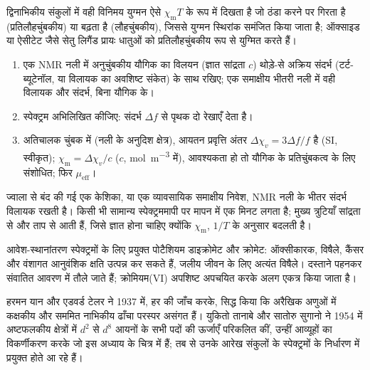 द्विनाभिकीय संकुलों में वही विनिमय युग्मन ऐसे $\chi_{\mathrm m}T$ के रूप में दिखता है जो ठंडा करने पर
गिरता है (प्रतिलौहचुंबकीय) या बढ़ता है (लौहचुंबकीय), जिससे युग्मन
स्थिरांक समंजित किया जाता है; ऑक्साइड या ऐसीटेट जैसे सेतु लिगैंड प्रायः
धातुओं को प्रतिलौहचुंबकीय रूप से युग्मित करते हैं।

\begin{method}[इवान्स विधि द्वारा चुंबकीय आघूर्ण]\label{met:b3:complex-spectra-magnetism:evans}
\begin{enumerate}
  \item एक NMR नली में अनुचुंबकीय यौगिक का विलयन (ज्ञात
        सांद्रता $c$) थोड़े-से अक्रिय संदर्भ (टर्ट-ब्यूटेनॉल, या
        विलायक का अवशिष्ट संकेत) के साथ रखिए; एक समाक्षीय भीतरी नली में वही विलायक और
        संदर्भ, बिना यौगिक के।
  \item {} स्पेक्ट्रम अभिलिखित कीजिए: संदर्भ $\Delta f$ से पृथक दो रेखाएँ देता है।
  \item अतिचालक चुंबक में (नली के अनुदिश क्षेत्र), आयतन
        प्रवृत्ति अंतर $\Delta\chi_v = 3\Delta f/f$ है (SI, स्वीकृत); $\chi_{\mathrm m} = \Delta\chi_v/c$ ($c$,
        \unit{mol.m^{-3}} में), आवश्यकता हो तो यौगिक के प्रतिचुंबकत्व के लिए संशोधित;
        फिर $\mu_{\mathrm{eff}}$।
\end{enumerate}
\end{method}

\begin{inthelab}[एक इवान्स मापन]
ज्वाला से बंद की गई एक केशिका, या एक व्यावसायिक समाक्षीय निवेश, NMR नली के भीतर संदर्भ
विलायक रखती है। किसी भी सामान्य स्पेक्ट्रममापी पर मापन में एक मिनट लगता है;
मुख्य त्रुटियाँ सांद्रता से और ताप से आती हैं,
जिसे ज्ञात होना चाहिए क्योंकि $\chi_{\mathrm m}$, $1/T$ के अनुसार बदलती है।
\end{inthelab}

\begin{safety}{}
आवेश-स्थानांतरण स्पेक्ट्रमों के लिए प्रयुक्त पोटैशियम डाइक्रोमेट और क्रोमेट:
ऑक्सीकारक, विषैले, कैंसर और वंशागत आनुवंशिक क्षति उत्पन्न कर सकते हैं, जलीय जीवन के लिए
अत्यंत विषैले। दस्ताने पहनकर संवातित आवरण में तौले जाते हैं; क्रोमियम(VI) अपशिष्ट
अपचयित करके अलग एकत्र किया जाता है।
\end{safety}

\begin{history}[यान और टेलर, तानाबे और सुगानो]
हरमन यान और एडवर्ड टेलर ने 1937 में, हर  की जाँच करके, सिद्ध किया
कि अरैखिक अणुओं में कक्षकीय  और सममित नाभिकीय ढाँचा परस्पर
असंगत हैं। युकितो तानाबे और सातोरु सुगानो ने 1954 में अष्टफलकीय क्षेत्रों में $d^2$ से $d^8$ आयनों के सभी
पदों की ऊर्जाएँ परिकलित कीं, उन्हीं आव्यूहों का विकर्णीकरण करके जो इस अध्याय के चित्र में हैं;
तब से उनके आरेख संकुलों के स्पेक्ट्रमों के निर्धारण में प्रयुक्त होते आ रहे हैं।
\end{history}

